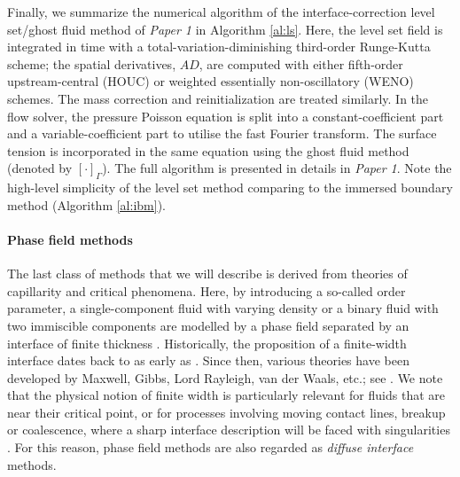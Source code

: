 Finally, we summarize the numerical algorithm of the interface-correction level set/ghost fluid method of \emph{Paper 1} in Algorithm \ref{al:ls}.
Here, the level set field is integrated in time with a total-variation-diminishing third-order Runge-Kutta scheme; the spatial derivatives, ${AD}$, are computed with either fifth-order upstream-central (HOUC) or weighted essentially non-oscillatory (WENO) schemes. The mass correction and reinitialization are treated similarly.
In the flow solver, the pressure Poisson equation is split into a constant-coefficient part and a variable-coefficient part to utilise the fast Fourier transform.
The surface tension is incorporated in the same equation using the ghost fluid method (denoted by $[\cdot]_\Gamma$).
The full algorithm is presented in details in \emph{Paper 1}. Note the high-level simplicity of the level set method comparing to the immersed boundary method (Algorithm \ref{al:ibm}).


\medskip
\paragraph{\bf Phase field methods}

The last class of methods that we will describe is derived from theories of capillarity and critical phenomena.
Here, by introducing a so-called order parameter, a single-component fluid with varying density or a binary fluid with two immiscible components are modelled by a phase field separated by an interface of finite thickness \citep{Anderson_McFadden_Wheeler}.
Historically, the proposition of a finite-width interface dates back to as early as \cite{Poisson1831}. Since then, various theories have been developed by Maxwell, Gibbs, Lord Rayleigh, van der Waals, etc.; see \eg \cite{van-der-waals1893, Cahn1961}.
We note that the physical notion of finite width is particularly relevant for fluids that are near their critical point, or for processes involving moving contact lines, breakup or coalescence, where a sharp interface description will be faced with singularities \citep{Zhang_Mohseni_2018, Eggers1997}.
For this reason, phase field methods are also regarded as \emph{diffuse interface} methods.

